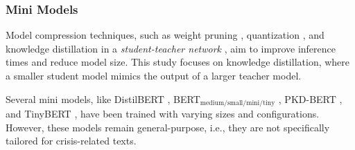 \subsubsection{Mini Models}
Model compression techniques, such as weight pruning \cite{han2015deep}, quantization \cite{gong2014compressing}, and knowledge distillation in a \textit{student-teacher network} \cite{hinton2015distillingknowledgeneuralnetwork}, aim to improve inference times and reduce model size. This study focuses on knowledge distillation, where a smaller student model mimics the output of a larger teacher model.

Several mini models, like DistilBERT \cite{sanh2020distilbertdistilledversionbert}, BERT$_{\text{medium/small/mini/tiny}}$ \cite{turc2019well}, PKD-BERT \cite{sun2019patient}, and TinyBERT \cite{jiao2019tinybert}, have been trained with varying sizes and configurations. However, these models remain general-purpose, i.e., they are not specifically tailored for crisis-related texts.